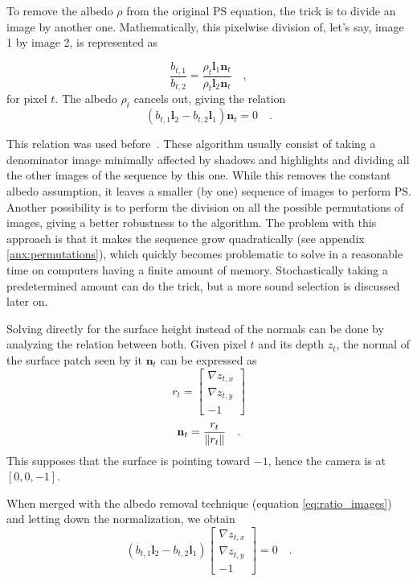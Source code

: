 To remove the albedo $\rho$ from the original PS equation, the trick is to divide an image by another one. Mathematically, this pixelwise division of, let's say, image 1 by image 2, is represented as

\begin{equation}
\frac{b_{t,1}}{b_{t,2}} = \frac{\rho_t \mathbf{l}_1 \mathbf{n}_t}{\rho_t \mathbf{l}_2 \mathbf{n}_t} \quad,
\end{equation}
for pixel $t$. The albedo $\rho_t$ cancels out, giving the relation
\begin{equation}
\label{eq:ratio_images}
\left( b_{t,1} \mathbf{l}_2 - b_{t,2} \mathbf{l}_1 \right) \mathbf{n}_t = 0  \quad.
\end{equation}

This relation was used before~\cite{yu-iccp-13,wu-pami-06}. These algorithm usually consist of taking a denominator image minimally affected by shadows and highlights and dividing all the other images of the sequence by this one. While this removes the constant albedo assumption, it leaves a smaller (by one) sequence of images to perform PS. Another possibility is to perform the division on all the possible permutations of images, giving a better robustness to the algorithm. The problem with this approach is that it makes the sequence grow quadratically (see appendix \ref{anx:permutations}), which quickly becomes problematic to solve in a reasonable time on computers having a finite amount of memory. Stochastically taking a predetermined amount can do the trick, but a more sound selection is discussed later on.
 
Solving directly for the surface height instead of the normals can be done by analyzing the relation between both. Given pixel $t$ and its depth $z_t$, the normal of the surface patch seen by it $\mathbf{n}_t$ can be expressed as
\begin{equation}
r_t = 
\begin{bmatrix}
\nabla z_{t,x} \\
\nabla z_{t,y} \\
-1
\end{bmatrix}
\end{equation}
\begin{equation}
\mathbf{n}_t =
\frac{r_t}{\left\lVert r_t\right\rVert} \quad.
\end{equation}
This supposes that the surface is pointing toward $-1$, hence the camera is at $[0, 0, -1]$.

When merged with the albedo removal technique (equation \eqref{eq:ratio_images}) and letting down the normalization, we obtain
\begin{equation}
\label{eq:pre-dlt}
\left( b_{t,1} \mathbf{l}_2 - b_{t,2} \mathbf{l}_1 \right)
\begin{bmatrix}
\nabla z_{t,x} \\
\nabla z_{t,y} \\
-1
\end{bmatrix}
= 0  \quad.
\end{equation}

